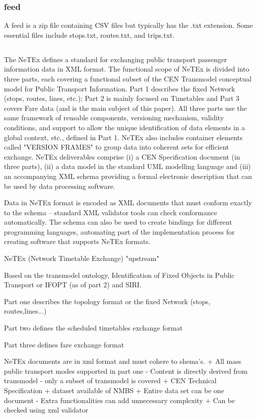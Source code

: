 \subsubsection{ feed}
A feed is a zip file containing CSV files but typically has the .txt extension. Some essential files include stops.txt, routes.txt, and trips.txt.


\subsection{}
The NeTEx defines a standard for exchanging public transport passenger information data in XML format. The functional
scope of NeTEx is divided into three parts, each covering a functional subset of the CEN Transmodel conceptual
model for Public Transport Information.
Part 1  describes the fixed Network (stops, routes, lines, etc.); Part 2  is mainly focused on Timetables and
Part 3  covers Fare data (and is the main subject of this paper). All three parts use the same framework of reusable
components, versioning mechanism, validity conditions, and support to allow the unique identification of data elements
in a global context, etc., defined in Part 1. NeTEx also includes container elements called "VERSION FRAMES"
to group data into coherent sets for efficient exchange.
NeTEx deliverables comprise (i) a CEN Specification document (in three parts), (ii) a data model in the standard UML
modelling language and (iii) an accompanying XML schema providing a formal electronic description that can be used by data processing software.

Data in NeTEx format is encoded as XML documents that must conform exactly to the schema – standard XML validator tools can check conformance automatically. The schema can also be used to create bindings for different
programming languages, automating part of the implementation process for creating software that supports NeTEx
formats. 

NeTEx (Network Timetable Exchange)
"upstream"

Based on the transmodel ontology, Identification of Fixed Objects in Public Transport or IFOPT (as of part 2) and SIRI.

Part one describes the topology format or the fixed Network (stops, routes,lines...)

Part two defines the scheduled timetables exchange format

Part three defines fare exchange format

NeTEx documents are in xml format and must cohere to shema's.
+ All mass public transport modes supported in part one
- Content is directly derived from transmodel
- only a subset of transmodel is covered
+ CEN Technical Specification
+ dataset available of NMBS
+ Entire data set can be one document
- Extra functionalities can add unnecessary complexity
+ Can be checked using xml validator


